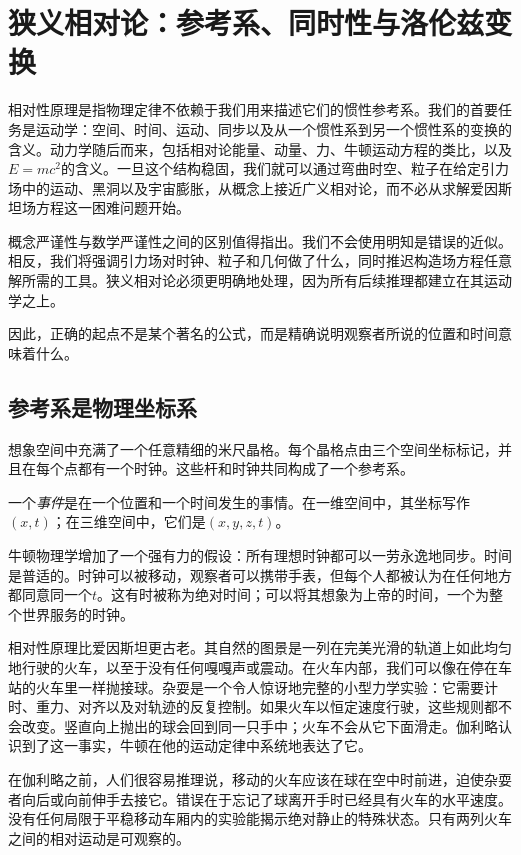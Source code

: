 \chapter{狭义相对论：参考系、同时性与洛伦兹变换}

相对性原理是指物理定律不依赖于我们用来描述它们的惯性参考系。我们的首要任务是运动学：空间、时间、运动、同步以及从一个惯性系到另一个惯性系的变换的含义。动力学随后而来，包括相对论能量、动量、力、牛顿运动方程的类比，以及\(E=mc^2\)的含义。一旦这个结构稳固，我们就可以通过弯曲时空、粒子在给定引力场中的运动、黑洞以及宇宙膨胀，从概念上接近广义相对论，而不必从求解爱因斯坦场方程这一困难问题开始。

概念严谨性与数学严谨性之间的区别值得指出。我们不会使用明知是错误的近似。相反，我们将强调引力场对时钟、粒子和几何做了什么，同时推迟构造场方程任意解所需的工具。狭义相对论必须更明确地处理，因为所有后续推理都建立在其运动学之上。

因此，正确的起点不是某个著名的公式，而是精确说明观察者所说的位置和时间意味着什么。

\section{参考系是物理坐标系}

想象空间中充满了一个任意精细的米尺晶格。每个晶格点由三个空间坐标标记，并且在每个点都有一个时钟。这些杆和时钟共同构成了一个参考系。

\begin{definition}
一个\emph{事件}是在一个位置和一个时间发生的事情。在一维空间中，其坐标写作\((x,t)\)；在三维空间中，它们是\((x,y,z,t)\)。
\end{definition}

牛顿物理学增加了一个强有力的假设：所有理想时钟都可以一劳永逸地同步。时间是普适的。时钟可以被移动，观察者可以携带手表，但每个人都被认为在任何地方都同意同一个\(t\)。这有时被称为绝对时间；可以将其想象为上帝的时间，一个为整个世界服务的时钟。

相对性原理比爱因斯坦更古老。其自然的图景是一列在完美光滑的轨道上如此均匀地行驶的火车，以至于没有任何嘎嘎声或震动。在火车内部，我们可以像在停在车站的火车里一样抛接球。杂耍是一个令人惊讶地完整的小型力学实验：它需要计时、重力、对齐以及对轨迹的反复控制。如果火车以恒定速度行驶，这些规则都不会改变。竖直向上抛出的球会回到同一只手中；火车不会从它下面滑走。伽利略认识到了这一事实，牛顿在他的运动定律中系统地表达了它。

在伽利略之前，人们很容易推理说，移动的火车应该在球在空中时前进，迫使杂耍者向后或向前伸手去接它。错误在于忘记了球离开手时已经具有火车的水平速度。没有任何局限于平稳移动车厢内的实验能揭示绝对静止的特殊状态。只有两列火车之间的相对运动是可观察的。

